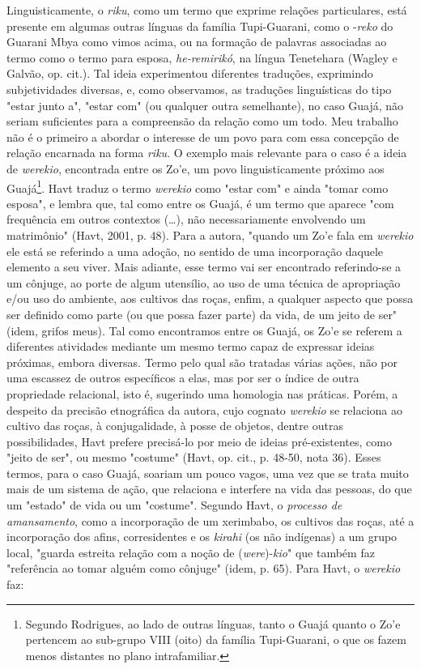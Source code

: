 Linguisticamente, o \emph{riku}, como um termo que exprime relações
particulares, está presente em algumas outras línguas da família
Tupi-Guarani, como o -\emph{reko} do Guarani Mbya como vimos acima, ou
na formação de palavras associadas ao termo como o termo para esposa,
\emph{he-remirikó}, na língua Tenetehara (Wagley e Galvão, op. cit.).
Tal ideia experimentou diferentes traduções, exprimindo subjetividades
diversas, e, como observamos, as traduções linguísticas do tipo "estar
junto a", "estar com" (ou qualquer outra semelhante), no caso Guajá, não
seriam suficientes para a compreensão da relação como um todo. Meu
trabalho não é o primeiro a abordar o interesse de um povo para com essa
concepção de relação encarnada na forma \emph{riku}. O exemplo mais
relevante para o caso é a ideia de \emph{werekio}, encontrada entre os
Zo'e, um povo linguisticamente próximo aos Guajá\footnote{Segundo
  Rodrigues, ao lado de outras línguas, tanto o Guajá quanto o Zo'e
  pertencem ao sub-grupo VIII (oito) da família Tupi-Guarani, o que os
  fazem menos distantes no plano intrafamiliar.}. Havt traduz o termo
\emph{werekio} como "estar com" e ainda "tomar como esposa", e lembra
que, tal como entre os Guajá, é um termo que aparece "com frequência em
outros contextos (\ldots{}), não necessariamente envolvendo um matrimônio"
(Havt, 2001, p. 48). Para a autora, "quando um Zo'e fala em
\emph{werekio} ele está se referindo a uma adoção, no sentido de uma
incorporação daquele elemento a seu viver. Mais adiante, esse termo vai
ser encontrado referindo-se a um cônjuge, ao porte de algum utensílio,
ao uso de uma técnica de apropriação e/ou uso do ambiente, aos cultivos
das roças, enfim, a qualquer aspecto que possa ser definido como parte
(ou que possa fazer parte) da vida, de um jeito de ser" (idem, grifos
meus). Tal como encontramos entre os Guajá, os Zo'e se referem a
diferentes atividades mediante um mesmo termo capaz de expressar ideias
próximas, embora diversas. Termo pelo qual são tratadas várias ações,
não por uma escassez de outros específicos a elas, mas por ser o índice
de outra propriedade relacional, isto é, sugerindo uma homologia nas
práticas. Porém, a despeito da precisão etnográfica da autora, cujo
cognato \emph{werekio} se relaciona ao cultivo das roças, à
conjugalidade, à posse de objetos, dentre outras possibilidades, Havt
prefere precisá-lo por meio de ideias pré-existentes, como "jeito de
ser", ou mesmo "costume" (Havt, op. cit., p. 48-50, nota 36). Esses
termos, para o caso Guajá, soariam um pouco vagos, uma vez que se trata
muito mais de um sistema de ação, que relaciona e interfere na vida das
pessoas, do que um "estado" de vida ou um "costume". Segundo Havt, o
\emph{processo de amansamento}, como a incorporação de um xerimbabo, os
cultivos das roças, até a incorporação dos afins, corresidentes e os
\emph{kirahi} (os não indígenas) a um grupo local, "guarda estreita
relação com a noção de (\emph{were})-\emph{kio}" que também faz
"referência ao tomar alguém como cônjuge" (idem, p. 65). Para Havt, o
\emph{werekio} faz:

